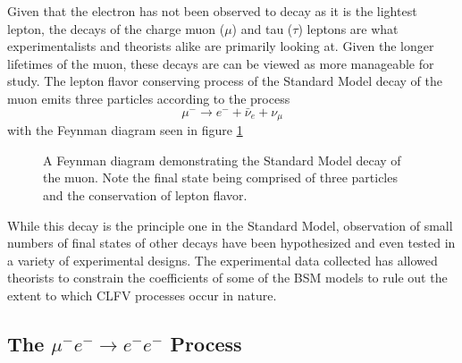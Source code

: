 \documentclass[12pt]{article}
\newcommand{\muEtoEE}{\mu^- e^- \to e^- e^-}
\begin{document}
Given that the electron has not been observed to decay as it is the lightest lepton, the decays of the charge muon ($\mu$) and tau ($\tau$) leptons are what experimentalists and theorists alike are primarily looking at. Given the longer lifetimes of the muon, these decays are can be viewed as more manageable for study. The lepton flavor conserving process of the Standard Model decay of the muon emits three particles according to the process 
\begin{equation}\label{SMMuonDecay}
    \mu^-\to e^-+\bar{\nu}_e+\nu_\mu
\end{equation}
with the Feynman diagram seen in figure \ref{feyn:SMMuonDecayFeynDiagram}

\begin{figure}[h!]
\begin{center}
\caption{A Feynman diagram demonstrating the Standard Model decay of the muon. Note the final state being comprised of three particles and the conservation of lepton flavor.}
\label{feyn:SMMuonDecayFeynDiagram}
\end{center}
\end{figure}

While this decay is the principle one in the Standard Model, observation of small numbers of final states of other decays have been hypothesized and even tested in a variety of experimental designs. The experimental data collected has allowed theorists to constrain the coefficients of some of the BSM models to rule out the extent to which CLFV processes occur in nature. 

\subsection{The $\muEtoEE$ Process} \label{subsec:MuEtoEETheory}
\end{document}
